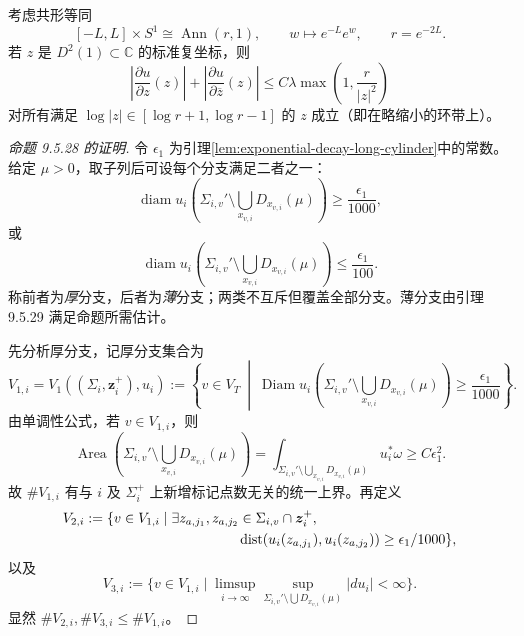 \begin{corollary}\label{cor:derivative-estimate-holomorphic-annulus}
考虑共形等同
\[
 [-L,L]\times S^1\cong\operatorname{Ann}(r,1),
 \qquad w\longmapsto e^{-L}e^w,\qquad r=e^{-2L}.
\]
若 $z$ 是 $D^2(1)\subset\mathbb C$ 的标准复坐标，则
\[
 \left|\frac{\partial u}{\partial z}(z)\right|
 +\left|\frac{\partial u}{\partial\overline z}(z)\right|
 \le C\lambda\max\left(1,\frac r{|z|^2}\right)
\]
对所有满足
$\log|z|\in[\log r+1,\log r-1]$ 的 $z$ 成立（即在略缩小的环带上）。
\end{corollary}

\begin{proof}[命题 9.5.28 的证明]
令 $\epsilon_1$ 为引理\ref{lem:exponential-decay-long-cylinder}中的常数。给定 $\mu>0$，取子列后可设每个分支满足二者之一：
\begin{equation}
 \operatorname{diam}u_i(\Sigma_{i,v}'\setminus
 \bigcup_{x_{v,i}}D_{x_{v,i}}(\mu))\ge\frac{\epsilon_1}{1000},
 \label{eq:thick-component-threshold}
\end{equation}
或
\begin{equation}
 \operatorname{diam}u_i(\Sigma_{i,v}'\setminus
 \bigcup_{x_{v,i}}D_{x_{v,i}}(\mu))\le\frac{\epsilon_1}{100}.
 \label{eq:thin-component-threshold}
\end{equation}
称前者为\emph{厚}分支，后者为\emph{薄}分支；两类不互斥但覆盖全部分支。薄分支由引理 9.5.29 满足命题所需估计。

先分析厚分支，记厚分支集合为
\[
 V_{1,i}=V_1((\Sigma_i,\boldsymbol z_i^+),u_i)
 :=\left\{v\in V_T\ \middle|\
 \operatorname{Diam}u_i\!\left(\Sigma_{i,v}'\setminus
 \bigcup_{x_{v,i}}D_{x_{v,i}}(\mu)\right)\ge\frac{\epsilon_1}{1000}
 \right\}.
\]
由单调性公式，若 $v\in V_{1,i}$，则
\[
 \operatorname{Area}\!\left(\Sigma_{i,v}'\setminus
 \bigcup_{x_{v,i}}D_{x_{v,i}}(\mu)\right)
 =\int_{\Sigma_{i,v}'\setminus\bigcup_{x_{v,i}}D_{x_{v,i}}(\mu)}u_i^*\omega
 \ge C\epsilon_1^2.
\]
故 $\#V_{1,i}$ 有与 $i$ 及 $\Sigma_i^+$ 上新增标记点数无关的统一上界。再定义
\begin{equation}
 \begin{split}
 V_{2,i}:={}&\{v\in V_{1,i}\mid
 \exists z_{a,j_1},z_{a,j_2}\in\Sigma_{i,v}\cap\boldsymbol z_i^+,\\
 &\hspace{33mm}
 \operatorname{dist}(u_i(z_{a,j_1}),u_i(z_{a,j_2}))
 \ge\epsilon_1/1000\},
 \end{split}
 \label{eq:marked-image-separated-components}
\end{equation}
以及
\begin{equation}
 V_{3,i}:=\{v\in V_{1,i}\mid
 \limsup_{i\to\infty}
 \sup_{\Sigma_{i,v}'\setminus\bigcup D_{x_{v,i}}(\mu)}|du_i|<\infty\}.
 \label{eq:bounded-derivative-components}
\end{equation}
显然 $\#V_{2,i},\#V_{3,i}\le\#V_{1,i}$。


\end{proof}
